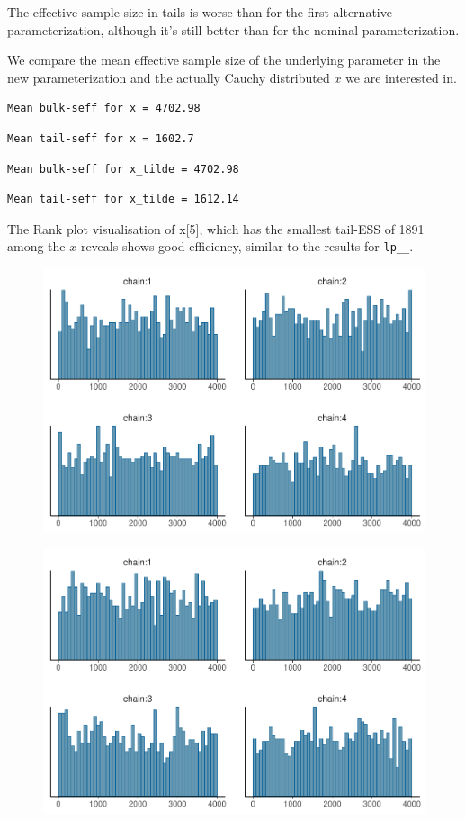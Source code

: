 \documentclass[american,]{article}
\begin{document}
The effective sample size in tails is worse than for the first
alternative parameterization, although it's still better than for the
nominal parameterization.

We compare the mean effective sample size of the underlying parameter in
the new parameterization and the actually Cauchy distributed \(x\) we
are interested in.

\begin{verbatim}
Mean bulk-seff for x = 4702.98
\end{verbatim}

\begin{verbatim}
Mean tail-seff for x = 1602.7
\end{verbatim}

\begin{verbatim}
Mean bulk-seff for x_tilde = 4702.98
\end{verbatim}

\begin{verbatim}
Mean tail-seff for x_tilde = 1612.14
\end{verbatim}

The Rank plot visualisation of x{[}5{]}, which has the smallest tail-ESS
of 1891 among the \(x\) reveals shows good efficiency, similar to the
results for \texttt{lp\_\_}.

\begin{figure}[t]
  \centering
  \includegraphics[width=0.6\linewidth]{graphics/hist-fit-alt3-1.pdf}
\end{figure}

\begin{figure}[t]
  \centering
  \includegraphics[width=0.6\linewidth]{graphics/hist-fit-alt3-lp-1.pdf}
\end{figure}
\end{document}
